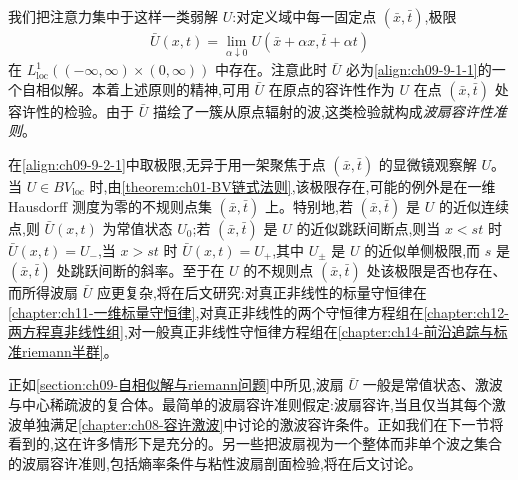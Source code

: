 \documentclass[../../main.tex]{subfiles}
\begin{document}
我们把注意力集中于这样一类弱解 $U$:对定义域中每一固定点 $(\bar{x},\bar{t})$,极限
\begin{align}
\bar{U}(x,t)=\lim_{\alpha\downarrow0}U(\bar{x}+\alpha x,\bar{t}+\alpha t)
\label{align:ch09-9-2-1}
\end{align}
在 $L^{1}_{\mathrm{loc}}((-\infty,\infty)\times(0,\infty))$ 中存在。注意此时 $\bar{U}$ 必为\eqref{align:ch09-9-1-1}的一个自相似解。本着上述原则的精神,可用 $\bar{U}$ 在原点的容许性作为 $U$ 在点 $(\bar{x},\bar{t})$ 处容许性的检验。由于 $\bar{U}$ 描绘了一簇从原点辐射的波,这类检验就构成\emph{波扇容许性准则}。

在\eqref{align:ch09-9-2-1}中取极限,无异于用一架聚焦于点 $(\bar{x},\bar{t})$ 的显微镜观察解 $U$。当 $U\in BV_{\mathrm{loc}}$ 时,由\cref{theorem:ch01-BV链式法则},该极限存在,可能的例外是在一维 Hausdorff 测度为零的不规则点集 $(\bar{x},\bar{t})$ 上。特别地,若 $(\bar{x},\bar{t})$ 是 $U$ 的近似连续点,则 $\bar{U}(x,t)$ 为常值状态 $U_{0}$;若 $(\bar{x},\bar{t})$ 是 $U$ 的近似跳跃间断点,则当 $x<st$ 时 $\bar{U}(x,t)=U_{-}$,当 $x>st$ 时 $\bar{U}(x,t)=U_{+}$,其中 $U_{\pm}$ 是 $U$ 的近似单侧极限,而 $s$ 是 $(\bar{x},\bar{t})$ 处跳跃间断的斜率。至于在 $U$ 的不规则点 $(\bar{x},\bar{t})$ 处该极限是否也存在、而所得波扇 $\bar{U}$ 应更复杂,将在后文研究:对真正非线性的标量守恒律在\cref{chapter:ch11-一维标量守恒律},对真正非线性的两个守恒律方程组在\cref{chapter:ch12-两方程真非线性组},对一般真正非线性守恒律方程组在\cref{chapter:ch14-前沿追踪与标准riemann半群}。

正如\cref{section:ch09-自相似解与riemann问题}中所见,波扇 $\bar{U}$ 一般是常值状态、激波与中心稀疏波的复合体。最简单的波扇容许准则假定:波扇容许,当且仅当其每个激波单独满足\cref{chapter:ch08-容许激波}中讨论的激波容许条件。正如我们在下一节将看到的,这在许多情形下是充分的。另一些把波扇视为一个整体而非单个波之集合的波扇容许准则,包括熵率条件与粘性波扇剖面检验,将在后文讨论。
\end{document}
